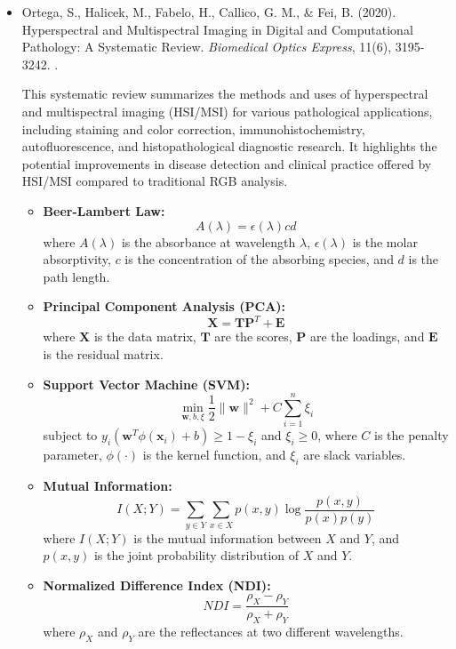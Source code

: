\documentclass[10pt,svgnames,fragile]{beamer}
\begin{document}
\begin{frame}{}
\tiny
\begin{itemize}

    \item Ortega, S., Halicek, M., Fabelo, H., Callico, G. M., & Fei, B. (2020). Hyperspectral and Multispectral Imaging in Digital and Computational Pathology: A Systematic Review. \textit{Biomedical Optics Express}, 11(6), 3195-3242. \href{https://doi.org/10.1364/BOE.386338}{\color{blue}{DOI: 10.1364/BOE.386338}}. \cite{ortegaHyperspectralMultispectralImaging2020}

    {\color{gray}This systematic review summarizes the methods and uses of hyperspectral and multispectral imaging (HSI/MSI) for various pathological applications, including staining and color correction, immunohistochemistry, autofluorescence, and histopathological diagnostic research. It highlights the potential improvements in disease detection and clinical practice offered by HSI/MSI compared to traditional RGB analysis.}
    \begin{itemize} \tiny
    \item \textbf{Beer-Lambert Law:}
    \[
    A(\lambda) = \epsilon(\lambda) c d
    \]
    where \( A(\lambda) \) is the absorbance at wavelength \( \lambda \), \( \epsilon(\lambda) \) is the molar absorptivity, \( c \) is the concentration of the absorbing species, and \( d \) is the path length.

    \item \textbf{Principal Component Analysis (PCA):}
    \[
    \mathbf{X} = \mathbf{TP}^T + \mathbf{E}
    \]
    where \( \mathbf{X} \) is the data matrix, \( \mathbf{T} \) are the scores, \( \mathbf{P} \) are the loadings, and \( \mathbf{E} \) is the residual matrix.

    \item \textbf{Support Vector Machine (SVM):}
    \[
    \min_{\mathbf{w}, b, \xi} \frac{1}{2} \|\mathbf{w}\|^2 + C \sum_{i=1}^n \xi_i
    \]
    subject to \( y_i (\mathbf{w}^T \phi(\mathbf{x}_i) + b) \geq 1 - \xi_i \) and \( \xi_i \geq 0 \), where \( C \) is the penalty parameter, \( \phi(\cdot) \) is the kernel function, and \( \xi_i \) are slack variables.

    \item \textbf{Mutual Information:}
    \[
    I(X;Y) = \sum_{y \in Y} \sum_{x \in X} p(x, y) \log \frac{p(x, y)}{p(x)p(y)}
    \]
    where \( I(X; Y) \) is the mutual information between \( X \) and \( Y \), and \( p(x, y) \) is the joint probability distribution of \( X \) and \( Y \).

    \item \textbf{Normalized Difference Index (NDI):}
    \[
    NDI = \frac{\rho_{X} - \rho_{Y}}{\rho_{X} + \rho_{Y}}
    \]
    where \( \rho_{X} \) and \( \rho_{Y} \) are the reflectances at two different wavelengths.
    \end{itemize}

\end{itemize}
\end{frame}
\end{document}
